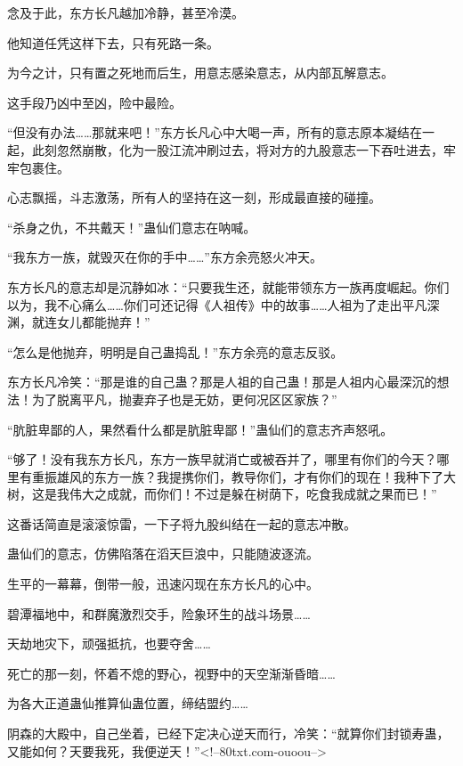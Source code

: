 \begin{this_body}
念及于此，东方长凡越加冷静，甚至冷漠。

他知道任凭这样下去，只有死路一条。

为今之计，只有置之死地而后生，用意志感染意志，从内部瓦解意志。

这手段乃凶中至凶，险中最险。

“但没有办法……那就来吧！”东方长凡心中大喝一声，所有的意志原本凝结在一起，此刻忽然崩散，化为一股江流冲刷过去，将对方的九股意志一下吞吐进去，牢牢包裹住。

心志飘摇，斗志激荡，所有人的坚持在这一刻，形成最直接的碰撞。

“杀身之仇，不共戴天！”蛊仙们意志在呐喊。

“我东方一族，就毁灭在你的手中……”东方余亮怒火冲天。

东方长凡的意志却是沉静如冰：“只要我生还，就能带领东方一族再度崛起。你们以为，我不心痛么……你们可还记得《人祖传》中的故事……人祖为了走出平凡深渊，就连女儿都能抛弃！”

“怎么是他抛弃，明明是自己蛊捣乱！”东方余亮的意志反驳。

东方长凡冷笑：“那是谁的自己蛊？那是人祖的自己蛊！那是人祖内心最深沉的想法！为了脱离平凡，抛妻弃子也是无妨，更何况区区家族？”

“肮脏卑鄙的人，果然看什么都是肮脏卑鄙！”蛊仙们的意志齐声怒吼。

“够了！没有我东方长凡，东方一族早就消亡或被吞并了，哪里有你们的今天？哪里有重振雄风的东方一族？我提携你们，教导你们，才有你们的现在！我种下了大树，这是我伟大之成就，而你们！不过是躲在树荫下，吃食我成就之果而已！”

这番话简直是滚滚惊雷，一下子将九股纠结在一起的意志冲散。

蛊仙们的意志，仿佛陷落在滔天巨浪中，只能随波逐流。

生平的一幕幕，倒带一般，迅速闪现在东方长凡的心中。

碧潭福地中，和群魔激烈交手，险象环生的战斗场景……

天劫地灾下，顽强抵抗，也要夺舍……

死亡的那一刻，怀着不熄的野心，视野中的天空渐渐昏暗……

为各大正道蛊仙推算仙蛊位置，缔结盟约……

阴森的大殿中，自己坐着，已经下定决心逆天而行，冷笑：“就算你们封锁寿蛊，又能如何？天要我死，我便逆天！”<!--80txt.com-ouoou-->

\end{this_body}

